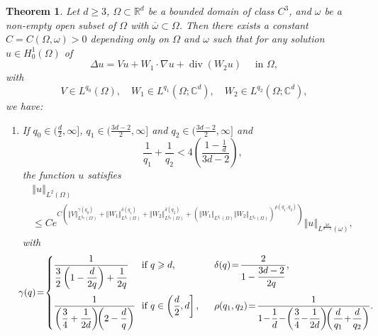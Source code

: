 \documentclass[10pt]{amsart}
\newtheorem{theo}{Theorem}[section]
\theoremstyle{definition}\newtheorem{defi}[theo]{Definition}\newtheorem{rema}[theo]{Remark}\newtheorem{exam}[theo]{Example}\newtheorem{exem}[theo]{Example}\newtheorem{nota}[theo]{Notation}
\newcommand*\R{\mathbb{R}}
\newcommand*\C{\mathbb{C}}
\newcommand*\ds{\displaystyle}
\newcommand{\norm}[1]{\left\Vert#1\right\Vert}
\renewcommand{\geq}{\geqslant}
\renewcommand{\div}{\operatorname{div}}
\begin{document}
\begin{theo}\label{Thm-QUCP}
Let $d\geqslant 3$, $\Omega \subset \R^{d}$ be a bounded domain of class $C^3$, and $\omega$ be a non-empty open subset of $\Omega$ with $\overline \omega \subset \Omega$.
Then there exists a constant $C=C(\Omega,\omega)>0$ depending only on $\Omega$ and $\omega$ such that for any solution $u\in H^{1}_0(\Omega)$ of
\begin{equation*}
\Delta u = V u + W_1 \cdot \nabla u + \div (W_2 u) \quad \text{ in } \Omega,
\end{equation*}
with
\begin{equation*}
V\in L^{q_0}(\Omega),
\quad W_1 \in L^{q_1}\left(\Omega; \C^d\right),
\quad W_2 \in L^{q_2}\left(\Omega; \C^d\right),
\end{equation*}
we have:
\begin{enumerate}
\item\label{theo1.3.1} If $q_0 \in (\frac{d}{2}, \infty]$, $q_1 \in (\frac{3d-2}{2}, \infty]$ and $q_2\in (\frac{3d-2}{2}, \infty]$ and
\[
\frac{1}{q_1} + \frac{1}{q_2} < 4\left(\frac{1-\frac{1}{d}}{3d-2}\right),
\]
the function $u$ satisfies
\begin{multline}\label{Quantitative-0}
\norm{u }_{L^2(\Omega)} \\
\leqslant C e^{ C \left(\norm{V}_{L^{q_0}(\Omega)}^{\gamma(q_0)}+\norm{W_1}_{L^{q_1}(\Omega)}^{\delta(q_1)} + \norm{W_2}_{L^{q_2}(\Omega)}^{\delta(q_2)} + \left(\norm{W_1}_{L^{q_1}(\Omega)}\norm{W_2}_{L^{q_2}(\Omega)}\right )^{\rho(q_1,q_2)}
\right) }\norm{u}_{L^{\frac{2d}{d-2}}(\omega)},
\end{multline}
with
\begin{equation*}
\! \! \! \gamma(q)\!=\! \left\{
\begin{array}{lll} \! \! \!
\ds \frac{1}{\ds \frac{3}{2} \left(1- \frac{d}{2q}\right) + \frac{1}{2q} } & \! \! \text{if } q \geq d,
\quad & \ds \!\! \delta(q)\! = \!\frac{2}{\ds 1 - \frac{3d-2}{2q}},
\medskip
\\
\ds \! \! \! \frac{1}{ \ds \left(\frac{3}{4} + \frac{1}{2d}\right) \!\! \left(2- \frac{d}{q}\right) } & \! \! \text{if } q \in \left(\ds \frac{d}{2},d\right],
\quad & \ds \!\! \rho(q_1,q_2) \!= \! \frac{1}{\ds 1 \!-\! \frac{1}{d}\! - \!\left(\frac{3}{4} \!-\! \frac{1}{2d}\right)\!\! \left(\frac{d}{q_1}\!+\! \frac{d}{q_2} \right) }.
\end{array}
\right.
\end{equation*}


\end{enumerate}
\end{theo}
\end{document}

